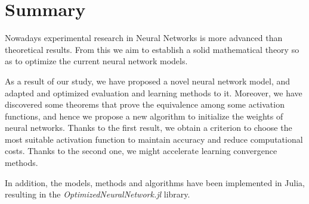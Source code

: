 %

\chapter*{Summary}\label{ch:summary}

Nowadays experimental research in Neural Networks is more advanced than theoretical
results. 
From this we aim to establish a solid mathematical theory so as to optimize the current neural network models. 


As a result of our study, we have proposed a novel neural 
network model, and adapted and optimized
evaluation and learning methods to it. 
Moreover, we have discovered some theorems that prove the 
equivalence among some activation functions, and hence we propose a new
 algorithm to initialize the weights of neural networks. Thanks to the
first result, we obtain a criterion to choose the most 
suitable activation function to maintain accuracy and reduce computational costs.
 Thanks to the second one, we might accelerate 
learning convergence methods.

In addition, the models, methods and algorithms have been 
implemented in Julia, resulting in the \textit{OptimizedNeuralNetwork.jl} library. 


